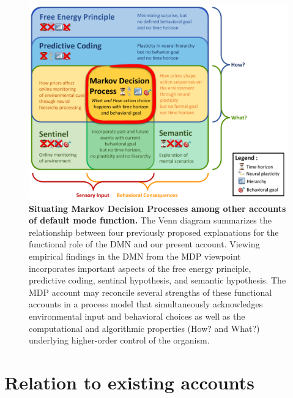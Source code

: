 \documentclass[10pt,letterpaper]{article}
\begin{document}
\begin{figure}[!h]
  \includegraphics[width=1\linewidth]{VennDiagram-2017-09-08.pdf}
  \caption{\textbf{Situating Markov Decision Processes among other accounts of default mode function.}
  The Venn diagram summarizes the relationship between four previously proposed explanations for the functional role of the DMN and our present account. Viewing empirical findings in the DMN from the MDP viewpoint incorporates important aspects of the free energy principle, predictive coding, sentinal hypothesis, and semantic hypothesis.
  The MDP account may reconcile several strengths of these functional accounts in a process model that simultaneously acknowledges environmental input and behavioral choices as well as the computational and algorithmic properties (How? and What?) underlying higher-order control of the organism.}
  \label{fig:VennDiagram}
\end{figure}

\section{Relation to existing accounts}
\end{document}
